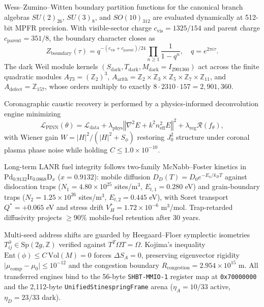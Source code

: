 \documentclass[twocolumn,aps,pra,floatfix,superscriptaddress,10pt]{revtex4-2}
\begin{document}
Wess--Zumino--Witten boundary partition functions for the canonical branch algebras $SU(2)_{26}$, $SU(3)_8$, and $SO(10)_{312}$ are evaluated dynamically at 512-bit MPFR precision. With visible-sector charge $c_{\text{vis}} = 1325/154$ and parent charge $c_{\text{parent}} = 351/8$, the boundary character closes as
\begin{equation}
    Z_{\text{boundary}}(\tau) = q^{-(c_{\text{vis}}+c_{\text{parent}})/24} \prod_{n\ge 1} \frac{1}{1 - q^n}, \quad q = e^{2\pi i\tau}.
\end{equation}
The dark Weil module kernels $(S_{\text{dark}}, T_{\text{dark}}, M_{\text{dark}} = I_{2901360})$ act across the finite quadratic modules $A_{T3} = (\mathbb{Z}_2)^3$, $A_{\text{arith}} = \mathbb{Z}_2 \times \mathbb{Z}_3 \times \mathbb{Z}_5 \times \mathbb{Z}_7 \times \mathbb{Z}_{11}$, and $A_{\text{defect}} = \mathbb{Z}_{157}$, whose orders multiply to exactly $8 \cdot 2310 \cdot 157 = 2{,}901{,}360$.

Coronagraphic caustic recovery is performed by a physics-informed deconvolution engine minimizing
\begin{equation}
    \mathcal{L}_{\text{PINN}}(\theta) = \mathcal{L}_{\text{data}} + \lambda_{\text{phys}} \left\Vert \nabla^2 E + k^2 n_{\text{eff}}^2 E \right\Vert^2 + \lambda_{\text{reg}} \mathcal{R}(f_\theta),
\end{equation}
with Wiener gain $W = \vert H\vert^2 / (\vert H\vert^2 + S_\phi)$ restoring $J_0^2$ structure under coronal plasma phase noise while holding $C \le 1.0 \times 10^{-10}$.

Long-term LANR fuel integrity follows two-family McNabb--Foster kinetics in $\text{Pd}_{0.9132}\text{Ir}_{0.0868}\text{D}_x$ ($x = 0.9132$): mobile diffusion $D_D(T) = D_0 e^{-E_a / k_B T}$ against dislocation traps ($N_1 = 4.80 \times 10^{25}$ sites/m$^3$, $E_{t,1} = 0.280$ eV) and grain-boundary traps ($N_2 = 1.25 \times 10^{26}$ sites/m$^3$, $E_{t,2} = 0.445$ eV), with Soret transport $Q^* = +0.065$ eV and stress drift $V_H^* = 1.72 \times 10^{-6}$ m$^3$/mol. Trap-retarded diffusivity projects $\ge 90\%$ mobile-fuel retention after 30 years.

Multi-seed address shifts are guarded by Heegaard--Floer symplectic isometries $T^\partial_{ij} \in \mathrm{Sp}(2g, \mathbb{Z})$ verified against $T^T \Omega T = \Omega$. Kojima's inequality $\mathrm{Ent}(\phi) \le C\,\mathrm{Vol}(M) = 0$ forces $\Delta S_A = 0$, preserving eigenvector rigidity $\vert\mu_{\text{comp}} - \mu_0\vert \le 10^{-12}$ and the congestion boundary $R_{\text{congestion}} = 2.954 \times 10^{15}$ m. All transferred engines bind to the 56-byte \texttt{SHBT-MMIO-1} register map at \texttt{0x70000000} and the 2,112-byte \texttt{UnifiedStinespringFrame} arena ($\eta_A = 10/33$ active, $\eta_D = 23/33$ dark).
\end{document}
